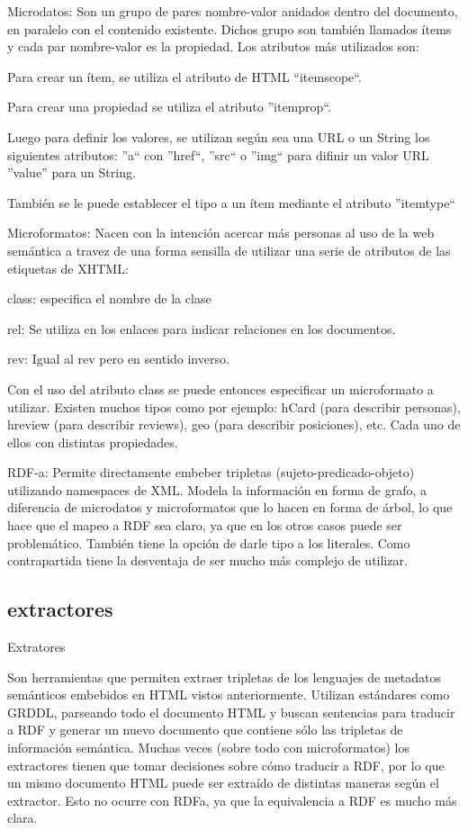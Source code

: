 Microdatos: Son un grupo de pares nombre-valor anidados dentro del documento, en paralelo con el contenido existente. Dichos grupo son 
también llamados ítems y cada par nombre-valor es la propiedad. Los atributos más utilizados son:

Para crear un ítem, se utiliza el atributo de HTML ``itemscope``. 

Para crear una propiedad se utiliza el atributo ''itemprop``.

Luego para definir los valores, se utilizan según sea una URL o un String los siguientes atributos:
''a`` con ''href``, ''src`` o ''img`` para difinir un valor URL
''value'' para un String.

También se le puede establecer el tipo a un ítem mediante el atributo ''itemtype``


Microformatos: Nacen con la intención acercar más personas al uso de la web semántica a travez de una forma sensilla de utilizar 
una serie de atributos de las etiquetas de XHTML:

class: especifica el nombre de la clase

rel: Se utiliza en los enlaces para indicar relaciones en los documentos.

rev: Igual al rev pero en sentido inverso.

Con el uso del atributo class se puede entonces especificar un microformato a utilizar. Existen muchos tipos como por ejemplo: hCard (para describir 
personas), hreview (para describir reviews), geo (para describir posiciones), etc. Cada uno de ellos con distintas propiedades.


RDF-a: Permite directamente embeber tripletas (sujeto-predicado-objeto) utilizando namespaces de XML. Modela la información en forma de grafo, 
a diferencia de microdatos y microformatos que lo hacen en forma de árbol, lo que hace que el mapeo a RDF sea claro, ya que en los otros casos puede ser problemático.
También tiene la opción de darle tipo a los literales. Como contrapartida tiene la desventaja de ser mucho más complejo de utilizar. 

\subsection{extractores}

Extratores

Son herramientas que permiten extraer tripletas de los lenguajes de metadatos semánticos embebidos en HTML vistos anteriormente. 
Utilizan estándares como GRDDL, parseando todo el documento HTML y buscan sentencias para traducir a RDF y generar un nuevo documento 
que contiene sólo las tripletas de información semántica. 
Muchas veces (sobre todo con microformatos) los extractores tienen que tomar decisiones sobre cómo traducir a RDF, por lo que 
un mismo documento HTML puede ser extraído de distintas maneras según el extractor. Esto no ocurre con RDFa, ya que la equivalencia a RDF es mucho 
más clara.

